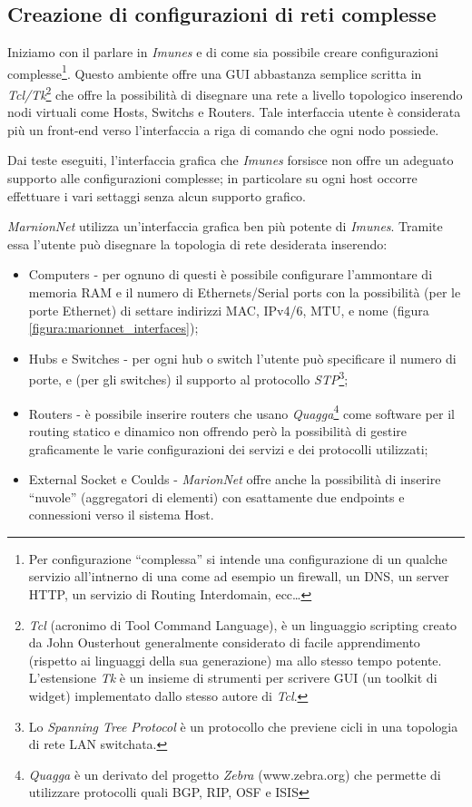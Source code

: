 \subsection{Creazione di configurazioni di reti complesse}
Iniziamo con il parlare in \emph{Imunes} e di come sia possibile creare configurazioni complesse\footnote{Per configurazione ``complessa'' si intende una configurazione di un qualche servizio all'intnerno di una \virtualmachine come ad esempio un firewall, un DNS, un server HTTP, un servizio di Routing Interdomain, ecc\ldots}.
Questo ambiente offre una GUI abbastanza semplice scritta in \emph{Tcl/Tk}\footnote{\emph{Tcl} (acronimo di Tool Command Language), è un linguaggio scripting creato da John Ousterhout generalmente considerato di facile apprendimento (rispetto ai linguaggi della sua generazione) ma allo stesso tempo potente. L'estensione \emph{Tk} è un insieme di strumenti per scrivere GUI (un toolkit di widget) implementato dallo stesso autore di \emph{Tcl}.} che offre la possibilità di disegnare una rete a livello topologico inserendo nodi virtuali come Hosts, Switchs e Routers. Tale interfaccia utente è considerata più un front-end verso l'interfaccia a riga di comando che ogni nodo possiede.

Dai teste eseguiti, l'interfaccia grafica che \emph{Imunes} forsisce non offre un adeguato supporto alle configurazioni complesse; in particolare su ogni host occorre effettuare i vari settaggi senza alcun supporto grafico.

\emph{MarnionNet} utilizza un'interfaccia grafica ben più potente di \emph{Imunes}. Tramite essa l'utente può disegnare\cite{MVNL08} la topologia di rete desiderata inserendo:
\begin{itemize}
 \item Computers - per ognuno di questi è possibile configurare l'ammontare di memoria RAM e il numero di Ethernets/Serial ports con la possibilità (per le porte Ethernet) di settare indirizzi MAC, IPv4/6, MTU, e nome (figura \ref{figura:marionnet_interfaces});
 \item Hubs e Switches - per ogni hub o switch l'utente può specificare il numero di porte, e (per gli switches) il supporto al protocollo \emph{STP}\footnote{Lo \emph{Spanning Tree Protocol} è un protocollo che previene cicli in una topologia di rete LAN switchata.};
 \item Routers - è possibile inserire routers che usano \emph{Quagga}\footnote{\emph{Quagga} è un derivato del progetto \emph{Zebra} (www.zebra.org) che permette di utilizzare protocolli quali BGP, RIP, OSF e ISIS} come software per il routing statico e dinamico non offrendo però la possibilità di gestire graficamente le varie configurazioni dei servizi e dei protocolli utilizzati;
 \item External Socket e Coulds - \emph{MarionNet} offre anche la possibilità di inserire ``nuvole'' (aggregatori di elementi) con esattamente due endpoints e connessioni verso il sistema Host.
\end{itemize}

